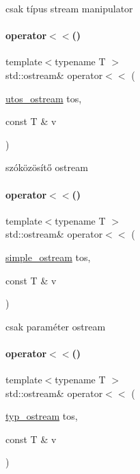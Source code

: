 csak típus stream manipulator 

\mbox{\label{schtring_8hpp_a89c0d4114f2a28d8ba3812f91ac3d0d2}} 
\paragraph{\texorpdfstring{operator$<$$<$()}{operator<<()}\hspace{0.1cm}{\footnotesize\ttfamily [4/8]}}
{\footnotesize\ttfamily template$<$typename T $>$ \\
std\+::ostream\& operator$<$$<$ (\begin{DoxyParamCaption}\item[{\mbox{\hyperlink{structutos__ostream}{utos\+\_\+ostream}}}]{tos,  }\item[{const T \&}]{v }\end{DoxyParamCaption})}



szóközösítő ostream 

\mbox{\label{schtring_8hpp_aea9b47ee5ee0daeefc307790dac9dbcf}} 
\paragraph{\texorpdfstring{operator$<$$<$()}{operator<<()}\hspace{0.1cm}{\footnotesize\ttfamily [5/8]}}
{\footnotesize\ttfamily template$<$typename T $>$ \\
std\+::ostream\& operator$<$$<$ (\begin{DoxyParamCaption}\item[{\mbox{\hyperlink{structsimple__ostream}{simple\+\_\+ostream}}}]{tos,  }\item[{const T \&}]{v }\end{DoxyParamCaption})}



csak paraméter ostream 

\mbox{\label{schtring_8hpp_aa279b7074acadd17c4bf119c9d5f7a53}} 
\paragraph{\texorpdfstring{operator$<$$<$()}{operator<<()}\hspace{0.1cm}{\footnotesize\ttfamily [6/8]}}
{\footnotesize\ttfamily template$<$typename T $>$ \\
std\+::ostream\& operator$<$$<$ (\begin{DoxyParamCaption}\item[{\mbox{\hyperlink{structtyp__ostream}{typ\+\_\+ostream}}}]{tos,  }\item[{const T \&}]{v }\end{DoxyParamCaption})}




